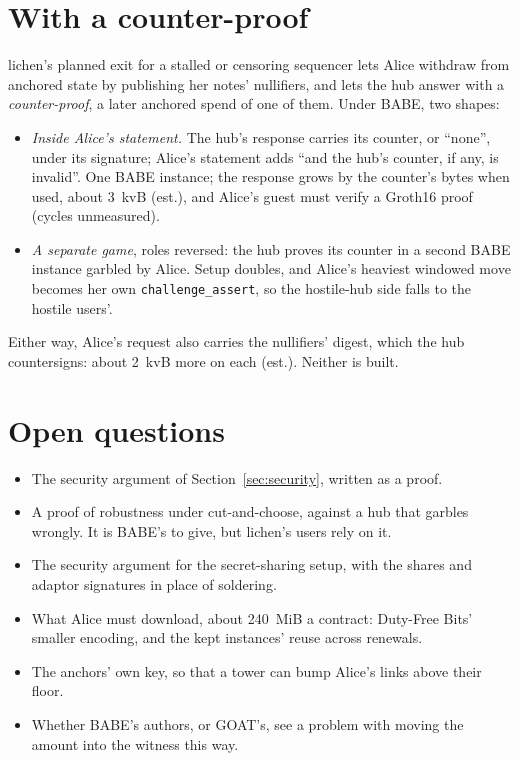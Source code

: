 \documentclass[11pt]{article}
\newcommand{\tx}[1]{\texttt{#1}}
\begin{document}
\section{With a counter-proof}
\label{sec:counter}

lichen's planned exit for a stalled or censoring sequencer lets Alice
withdraw from anchored state by publishing her notes' nullifiers, and
lets the hub answer with a \emph{counter-proof}, a later anchored spend
of one of them. Under BABE, two shapes:
\begin{itemize}[leftmargin=1.5em]
\item \emph{Inside Alice's statement.} The hub's response carries its
  counter, or ``none'', under its signature; Alice's statement adds
  ``and the hub's counter, if any, is invalid''. One BABE instance; the
  response grows by the counter's bytes when used, about 3~kvB (est.),
  and Alice's guest must verify a Groth16 proof (cycles unmeasured).
\item \emph{A separate game}, roles reversed: the hub proves its counter
  in a second BABE instance garbled by Alice. Setup doubles, and Alice's
  heaviest windowed move becomes her own \tx{challenge\_assert}, so the
  hostile-hub side falls to the hostile users'.
\end{itemize}
Either way, Alice's request also carries the nullifiers' digest, which
the hub countersigns: about 2~kvB more on each (est.). Neither is built.

\section{Open questions}
\label{sec:open}

\begin{itemize}[leftmargin=1.5em]
\item The security argument of Section~\ref{sec:security}, written as a
  proof.
\item A proof of robustness under cut-and-choose, against a hub that
  garbles wrongly. It is BABE's to give, but lichen's users rely on it.
\item The security argument for the secret-sharing setup, with the
  shares and adaptor signatures in place of soldering.
\item What Alice must download, about 240~MiB a contract: Duty-Free
  Bits' smaller encoding, and the kept instances' reuse across renewals.
\item The anchors' own key, so that a tower can bump Alice's links above
  their floor.
\item Whether BABE's authors, or GOAT's, see a problem with moving the
  amount into the witness this way.
\end{itemize}
\end{document}
